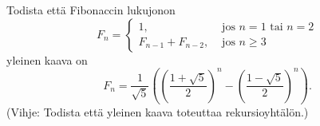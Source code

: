 
\begin{tehtavasivu}

\begin{tehtava}
\label{fibonacciyleinenkaavatehtava}
Todista että Fibonaccin lukujonon
\[F_n = \left\{\begin{array}{ll}
1,&\text{ jos } n = 1 \text{ tai } n = 2 \\
F_{n - 1} + F_{n - 2},&\text{ jos } n \geq 3
\end{array}\right.\]
yleinen kaava on 
\[F_n = \frac{1}{\sqrt{5}} \left(\left(\frac{1+\sqrt{5}}{2}\right)^n - \left(\frac{1-\sqrt{5}}{2}\right)^n\right).\]
(Vihje: Todista että yleinen kaava toteuttaa rekursioyhtälön.)
\end{tehtava}

\end{tehtavasivu}
